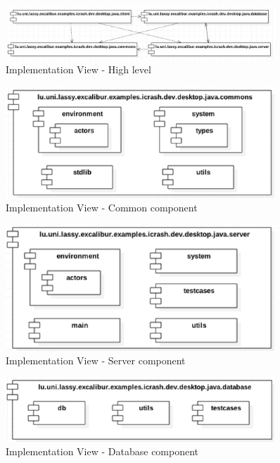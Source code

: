 \begin{figure}[h!]
	\centering
	\includegraphics[width=0.9\textwidth]{./images/impl_highlevel.eps}
	\caption{Implementation View - High level}
\end{figure}

\begin{figure}[h!]
	\centering
	\includegraphics[width=0.9\textwidth]{./images/impl_commons.eps}
	\caption{Implementation View - Common component}
\end{figure}

\begin{figure}[h!]
	\centering
	\includegraphics[width=0.9\textwidth]{./images/impl_server.eps}
	\caption{Implementation View - Server component}
\end{figure}

\begin{figure}[h!]
	\centering
	\includegraphics[width=0.9\textwidth]{./images/impl_db.eps}
	\caption{Implementation View - Database component}
\end{figure}

